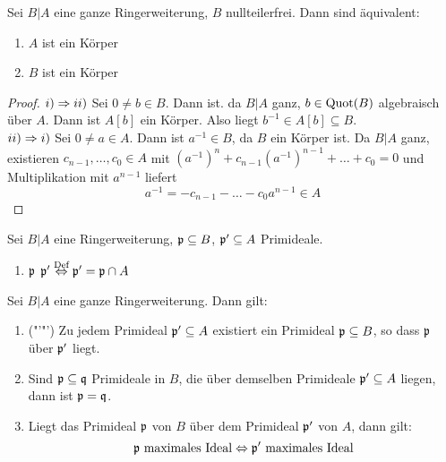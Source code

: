 \begin{bem}\label{15.15}
	Sei $B|A$ eine ganze Ringerweiterung, $B$ nullteilerfrei. Dann sind äquivalent:
	\begin{enumerate}[label= \roman*)]
		\item $A$ ist ein Körper
		\item $B$ ist ein Körper
	\end{enumerate}
\end{bem}
\begin{proof}
	$i)\Rightarrow ii)$ Sei $0\neq b\in B$. Dann ist. da $B|A$ ganz, $b\in \operatorname{Quot}(B)$ algebraisch über $A$. Dann ist $A[b]$ ein Körper. Also liegt $b^{-1}\in A[b]\subseteq B$.\\
	$ii)\Rightarrow i)$ Sei $0\neq a\in A$. Dann ist $a^{-1}\in B$, da $B$ ein Körper ist. Da $B|A$ ganz, existieren $c_{n-1}, \ldots, c_0\in A$ mit $(a^{-1})^n + c_{n-1} (a^{-1})^{n-1} + \ldots + c_0 =0$ und Multiplikation mit $a^{n-1}$ liefert
	$$a^{-1} = - c_{n-1} - \ldots - c_0 a^{n-1}\in A$$
\end{proof}
\begin{df}
	Sei $B|A$ eine Ringerweiterung, $\mathfrak{p}\subseteq B$, $\mathfrak{p}'\subseteq A$ Primideale.
	\begin{enumerate}
		\item[] $\mathfrak{p}$  $\mathfrak{p}' \overset{\text{Def}}{\Leftrightarrow} \mathfrak{p}' = \mathfrak{p} \cap A$ 
	\end{enumerate}
\end{df}
\begin{sa}\label{15.17}
	Sei $B|A$ eine ganze Ringerweiterung. Dann gilt:
	\begin{enumerate}[label= \alph*)]
		\item ("'"') Zu jedem Primideal $\mathfrak{p}'\subseteq A$ existiert ein Primideal $\mathfrak{p}\subseteq B$, so dass $\mathfrak{p}$ über $\mathfrak{p}'$ liegt. 
		\item Sind $\mathfrak{p} \subseteq \mathfrak{q}$ Primideale in $B$, die über demselben Primideale $\mathfrak{p}'\subseteq A$ liegen, dann ist $\mathfrak{p}=\mathfrak{q}$.
		\item Liegt das Primideal $\mathfrak{p}$ von $B$ über dem Primideal $\mathfrak{p}'$ von $A$, dann gilt:
		$$\mathfrak{p} \text{ maximales Ideal} \Leftrightarrow \mathfrak{p}' \text{ maximales Ideal}$$
	\end{enumerate}
\end{sa}
